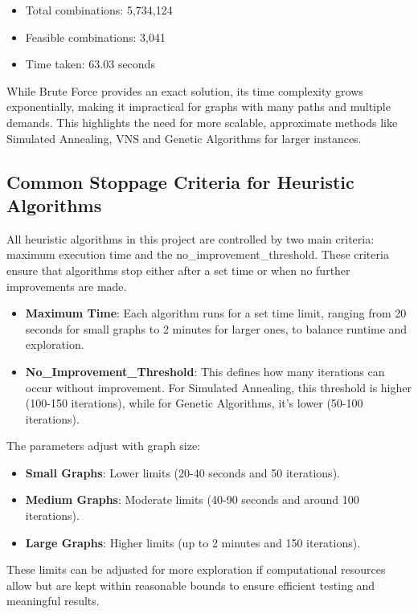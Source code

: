 \documentclass[a4paper,12pt]{article}
\begin{document}
\begin{itemize}
    \item Total combinations: 5,734,124
    \item Feasible combinations: 3,041
    \item Time taken: 63.03 seconds
\end{itemize}

\noindent  While Brute Force provides an exact solution, its time complexity grows exponentially, making it impractical for graphs with many paths and multiple demands. This highlights the need for more scalable, approximate methods like Simulated Annealing, VNS and Genetic Algorithms for larger instances.

\subsection{Common Stoppage Criteria for Heuristic Algorithms}

All heuristic algorithms in this project are controlled by two main criteria: maximum execution time and the no\_improvement\_threshold. These criteria ensure that algorithms stop either after a set time or when no further improvements are made.

\begin{itemize}
    \item \textbf{Maximum Time}: Each algorithm runs for a set time limit, ranging from 20 seconds for small graphs to 2 minutes for larger ones, to balance runtime and exploration.
    \item \textbf{No\_Improvement\_Threshold}: This defines how many iterations can occur without improvement. For Simulated Annealing, this threshold is higher (100-150 iterations), while for Genetic Algorithms, it’s lower (50-100 iterations).
\end{itemize}

The parameters adjust with graph size:
\begin{itemize}
    \item \textbf{Small Graphs}: Lower limits (20-40 seconds and 50 iterations).
    \item \textbf{Medium Graphs}: Moderate limits (40-90 seconds and around 100 iterations).
    \item \textbf{Large Graphs}: Higher limits (up to 2 minutes and 150 iterations).
\end{itemize}

\noindent These limits can be adjusted for more exploration if computational resources allow but are kept within reasonable bounds to ensure efficient testing and meaningful results.
\end{document}
